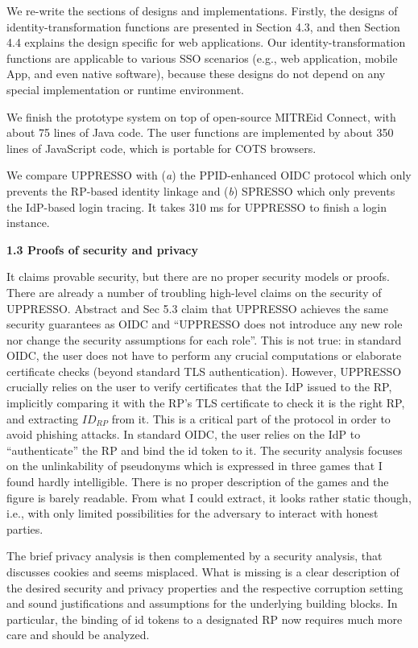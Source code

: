 \documentclass[letterpaper,onecolumn,10pt]{article}
\begin{document}
We re-write the sections of designs and implementations.
Firstly,
    the designs of identity-transformation functions are presented in Section 4.3,
        and then Section 4.4 explains the design specific for web applications.
Our identity-transformation functions are applicable to various SSO scenarios
        (e.g., web application, mobile App, and even native software),
    because these designs do not depend on any special implementation or runtime environment.

We finish the prototype system on top of open-source MITREid Connect,
    with about 75 lines of Java code.
The user functions are implemented by about 350 lines of JavaScript code,
    which is portable for COTS browsers.
    
We compare UPPRESSO with (\emph{a}) the PPID-enhanced OIDC protocol which only prevents the RP-based identity linkage
     and (\emph{b}) SPRESSO which only prevents the IdP-based login tracing.
It takes 310 ms for UPPRESSO to finish a login instance.

\vspace{1mm}\noindent\textbf{1.3 Proofs of security and privacy}

It claims provable security, but there are no proper security models or proofs.
There are already a number of troubling high-level claims on the security of UPPRESSO.
Abstract and Sec 5.3 claim that UPPRESSO achieves the same security guarantees as OIDC and ``UPPRESSO does not introduce any new role nor change the security assumptions for each role''.
This is not true: in standard OIDC, the user does not have to perform any crucial computations or elaborate certificate checks (beyond standard TLS authentication).
However, UPPRESSO crucially relies on the user to verify certificates that the IdP issued to the RP, implicitly comparing it with the RP's TLS certificate to check it is the right RP, and extracting $ID_{RP}$ from it.
This is a critical part of the protocol in order to avoid phishing attacks. In standard OIDC, the user relies on the IdP to ``authenticate'' the RP and bind the id token to it.
The security analysis focuses on the unlinkability of pseudonyms which is expressed in three games that I found hardly intelligible.
There is no proper description of the games and the figure is barely readable.
From what I could extract, it looks rather static though, i.e., with only limited possibilities for the adversary to interact with honest parties.

The brief privacy analysis is then complemented by a security analysis, that discusses cookies and seems misplaced.
What is missing is a clear description of the desired security and privacy properties and the respective corruption setting and sound justifications and assumptions for the underlying building blocks. In particular, the binding of id tokens to a designated RP now requires much more care and should be analyzed.
\end{document}

